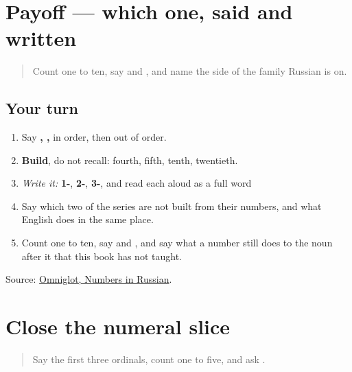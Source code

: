 \section[Practice]{Payoff — which one, said and written}

\label{lesson:RU-C26-practice}



\begin{quote}
Count one to ten, say \textbf{} and \textbf{}, and name the side of the family Russian is on.
\end{quote}

\subsection*{Your turn}
\begin{enumerate}
\raggedright
  \item Say \textbf{, , } in order, then out of order.
  \item \textbf{Build}, do not recall: fourth, fifth, tenth, twentieth.
  \item \emph{Write it:} \textbf{1-}, \textbf{2-}, \textbf{3-}, and read each aloud as a full word
  \item Say which two of the series are not built from their numbers, and what English does in the same place.
  \item Count one to ten, say \textbf{} and \textbf{}, and say what a number still does to the noun after it that this book has not taught.
\end{enumerate}

\begin{tcolorbox}[breakable,colback=teal!4,colframe=teal!35!black,title={Before you move on}]
Source: \href{https://www.omniglot.com/language/numbers/russian.htm}{Omniglot, Numbers in Russian}.
\end{tcolorbox}
\section[Practice]{Close the numeral slice}

\label{lesson:RU-R26-close}



\begin{quote}
Say the first three ordinals, count one to five, and ask \textbf{}.
\end{quote}

